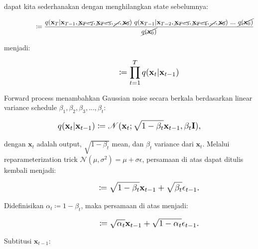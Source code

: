 \documentclass{article}
\newcommand*{\Scale}[2][4]{\scalebox{#1}{\ensuremath{#2}}}
\begin{document}
dapat kita sederhanakan dengan menghilangkan state sebelumnya:

\begin{equation}
\Scale[1.2]{ \displaystyle
\hspace{4.75em} \coloneq \frac{q(\textbf{x}_{T}|\textbf{x}_{T-1},\cancel{\textbf{x}_{T-2}},\cancel{\textbf{x}_{T-3}},\cancel{...},\cancel{\textbf{x}_{0}}) \ q(\textbf{x}_{T-1}|\textbf{x}_{T-2},\cancel{\textbf{x}_{T-3}},\cancel{\textbf{x}_{T-4}},\cancel{...},\cancel{\textbf{x}_{0}}) \ ... \ \cancel{ q(\textbf{x}_{0}) } } {  \cancel{ q(\textbf{x}_{0}) } } } 
\end{equation}

menjadi:

\begin{equation}
\Scale[1.2]{ \displaystyle
\hspace{4.75em} \coloneq \displaystyle \prod_{t=1}^{T} q(\textbf{x}_{t}|\textbf{x}_{t-1}) }
\end{equation}

Forward process menambahkan Gaussian noise secara berkala berdasarkan linear variance schedule $ \beta_1, \beta_2, \beta_3, ..., \beta_t $:

\begin{equation}
\Scale[1.2]{ \displaystyle
q(\textbf{x}_{t}|\textbf{x}_{t-1}) \coloneq \mathscr{N}(\textbf{x}_{t};\sqrt{1-\beta_t}\textbf{x}_{t-1},\beta_t \textbf{I}), }
\end{equation}

dengan $ \textbf{x}_{t} $ adalah output, $ \sqrt{1-\beta_t} $ mean, dan $ \beta_t $ variance dari $ \textbf{x}_{t} $. Melalui reparameterization trick $ \mathscr{N}(\mu,\sigma^2) = \mu + \sigma \epsilon $, persamaan di atas dapat ditulis kembali menjadi:

\begin{equation}
\Scale[1.2]{ \displaystyle
\hspace{4.75em} \coloneq \sqrt{1-\beta_t}\textbf{x}_{t-1} + \sqrt{\beta_t}\epsilon_{t-1}. }
\end{equation}

Didefinisikan $ \alpha_t \coloneq 1 - \beta_t $, maka persamaan di atas menjadi:

\begin{equation}
\Scale[1.2]{ \displaystyle
\hspace{4.75em} \coloneq \sqrt{\alpha_t}\textbf{x}_{t-1} + \sqrt{1-\alpha_t}\epsilon_{t-1}. }
\end{equation}

Subtitusi $ \textbf{x}_{t-1} $:
\end{document}
